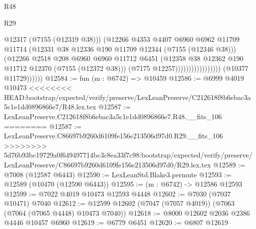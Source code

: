 \begin{lexlean}{R48}
\begin{lexlean}{R29}
\begin{coremodule}
{{{{{{{{{{{{{{{{{{{{{{{{{{{{{{{{{{{{{{{{{{{{{{{{{{{{{{{{{{{{{{{{{{{{{{{{{{{{{{{{{{{{{{{{{{{{{{{{{{{{{{{{{{{{{{{{{{{{{{{{{{{{{{{{{{{{{{{{{{{{{{{{{{{{{{{{{{{{{{{{{{{{{{{{{{{{{{{{{{{{{{{{{{{{{{{{{{{{{{{{{{{{{{{{{{{{{{{{{{                                            @12317
                                            (@7155 (@12319 @38)))
                                          (@12266
                                            @4353
                                            @4407
                                            @6960
                                            @6962
                                            @11709
                                            @11714
                                            (@12331
                                              @38
                                              @12336
                                              @190
                                              @11709
                                              @12344
                                              (@7155 (@12346 @38)))
                                            (@12266
                                              @2518
                                              @208
                                              @6960
                                              @6960
                                              @11712
                                              @6451
                                              (@12358
                                                @38
                                                @12362
                                                @190
                                                @11712
                                                @12370
                                                (@7155 (@12372 @38)))
                                              (@7175 @12257)))))))))))))))))
              (@10377 @11729))))))
@12584 := fun (m : @6742) => @10459
@12586 := @6999 @4019 @10473
<<<<<<<< HEAD:bootstrap/expected/verify/preserve/LexLeanPreserve/C212618f8b6ebac3a5c1e1dd0896866e7/R48.lex.tex
@12587 := LexLeanPreserve.C212618f8b6ebac3a5c1e1dd0896866e7.R48.__fits_106
========
@12587 := LexLeanPreserve.C86697b9260d6109fe156e213506d97d0.R29.__fits_106
>>>>>>>> 5d76b93bc19729a0f649497714bc3c8ea33f7c98:bootstrap/expected/verify/preserve/LexLeanPreserve/C86697b9260d6109fe156e213506d97d0/R29.lex.tex
@12589 := @7008 (@12587 @6443)
@12590 := LexLeanStd.Blake3.permute
@12593 := @12589 (@10470 (@12590 @6443))
@12595 := (m : @6742) -> @12586 @12593
@12599 := @7022 @4019 @10473 @12593 @4448
@12602 := @7030 (@7037 @10471) @7040
@12612 := @12599 @12602 (@7047 (@7057 @4019)) (@7063 (@7064 (@7065 @4448) @10473 @7040))
@12618 := @8000 @12602 @2036 @2386 @4446 @10457 @6960
@12619 := @6779 @6451
@12620 := @6807 @12619
}}}}}}}}}}}}}}}}}}}}}}}}}}}}}}}}}}}}}}}}}}}}}}}}}}}}}}}}}}}}}}}}}}}}}}}}}}}}}}}}}}}}}}}}}}}}}}}}}}}}}}}}}}}}}}}}}}}}}}}}}}}}}}}}}}}}}}}}}}}}}}}}}}}}}}}}}}}}}}}}}}}}}}}}}}}}}}}}}}}}}}}}}}}}}}}}}}}}}}}}}}}}}}}}}}}}}}}}}}
\end{coremodule}
\end{lexlean}
\end{lexlean}
